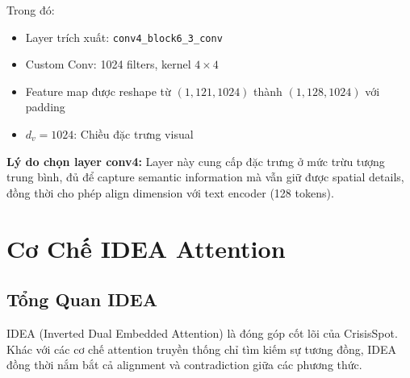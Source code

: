 \documentclass[12pt,a4paper]{article}
\begin{document}
Trong đó:
\begin{itemize}
    \item Layer trích xuất: \texttt{conv4\_block6\_3\_conv}
    \item Custom Conv: 1024 filters, kernel $4 \times 4$
    \item Feature map được reshape từ $(1, 121, 1024)$ thành $(1, 128, 1024)$ với padding
    \item $d_v = 1024$: Chiều đặc trưng visual
\end{itemize}

\textbf{Lý do chọn layer conv4:} Layer này cung cấp đặc trưng ở mức trừu tượng trung bình, đủ để capture semantic information mà vẫn giữ được spatial details, đồng thời cho phép align dimension với text encoder (128 tokens).

\section{Cơ Chế IDEA Attention}

\subsection{Tổng Quan IDEA}

IDEA (Inverted Dual Embedded Attention) là đóng góp cốt lõi của CrisisSpot. Khác với các cơ chế attention truyền thống chỉ tìm kiếm sự tương đồng, IDEA đồng thời nắm bắt cả alignment và contradiction giữa các phương thức.
\end{document}

